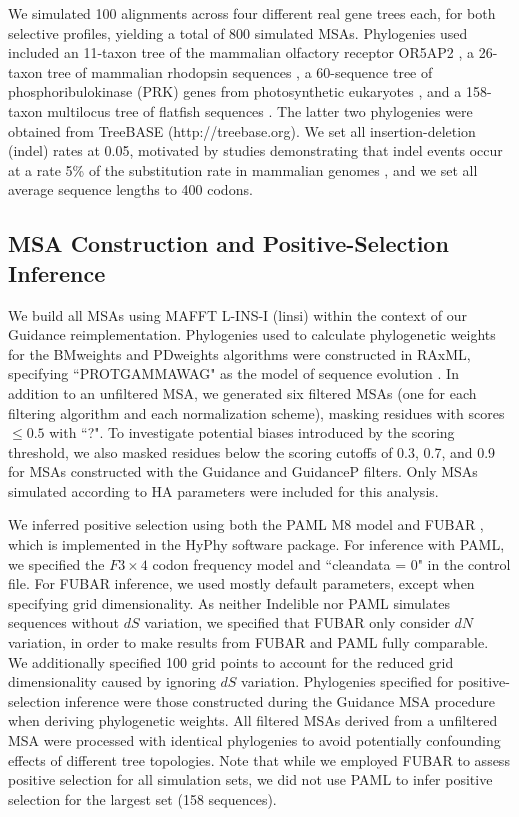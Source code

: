 \documentclass[11pt]{article}
\begin{document}
We simulated 100 alignments across four different real gene trees each, for both selective profiles, yielding a total of 800 simulated MSAs. Phylogenies used included an 11-taxon tree of the mammalian olfactory receptor OR5AP2 \citep{Spielman2013}, a 26-taxon tree of mammalian rhodopsin sequences \citep{Spielman2013}, a 60-sequence tree of phosphoribulokinase (PRK) genes from photosynthetic eukaryotes \citep{Yang2011}, and a 158-taxon multilocus tree of flatfish sequences \citep{Betancur2013}. The latter two phylogenies were obtained from TreeBASE (http://treebase.org). We set all insertion-deletion (indel) rates at 0.05, motivated by studies demonstrating that indel events occur at a rate 5\% of the substitution rate in mammalian genomes \citep{Cooper2004}, and we set all average sequence lengths to 400 codons.

\subsection*{MSA Construction and Positive-Selection Inference}

We build all MSAs using MAFFT L-INS-I (linsi) \citep{Katoh2002,Katoh2005} within the context of our Guidance reimplementation. Phylogenies used to calculate phylogenetic weights for the BMweights and PDweights algorithms were constructed in RAxML, specifying ``PROTGAMMAWAG" as the model of sequence evolution \citep{Stamatakis2006}. In addition to an unfiltered MSA, we generated six filtered MSAs (one for each filtering algorithm and each normalization scheme), masking residues with scores $\leq0.5$ with ``?". To investigate potential biases introduced by the scoring threshold, we also masked residues below the scoring cutoffs of 0.3, 0.7, and 0.9 for MSAs constructed with the Guidance and GuidanceP filters. Only MSAs simulated according to HA parameters were included for this analysis.

We inferred positive selection using both the PAML M8 model \citep{Yang2007} and FUBAR \citep{Murrell2013}, which is implemented in the HyPhy \citep{Pond2005} software package. For inference with PAML, we specified the $F3\times4$ codon frequency model and ``cleandata = 0" in the control file. For FUBAR inference, we used mostly default parameters, except when specifying grid dimensionality. As neither Indelible nor PAML simulates sequences without $dS$ variation, we specified that FUBAR only consider $dN$ variation, in order to make results from FUBAR and PAML fully comparable. We additionally specified 100 grid points to account for the reduced grid dimensionality caused by ignoring $dS$ variation. Phylogenies specified for positive-selection inference were those constructed during the Guidance MSA procedure when deriving phylogenetic weights. All filtered MSAs derived from a unfiltered MSA were processed with identical phylogenies to avoid potentially confounding effects of different tree topologies. Note that while we employed FUBAR to assess positive selection for all simulation sets, we did not use PAML to infer positive selection for the largest set (158 sequences).
\end{document}
